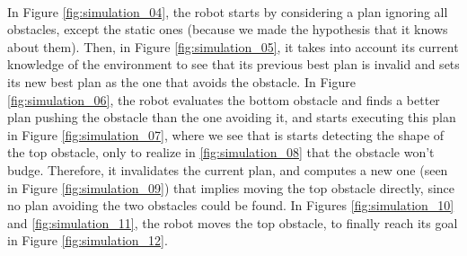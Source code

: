 \paragraph{} In Figure \ref{fig:simulation_04}, the robot starts by considering a plan ignoring all obstacles, except the static ones (because we made the hypothesis that it knows about them). Then, in Figure \ref{fig:simulation_05}, it takes into account its current knowledge of the environment to see that its previous best plan is invalid and sets its new best plan as the one that avoids the obstacle. In Figure \ref{fig:simulation_06}, the robot evaluates the bottom obstacle and finds a better plan pushing the obstacle than the one avoiding it, and starts executing this plan in Figure \ref{fig:simulation_07}, where we see that is starts detecting the shape of the top obstacle, only to realize in \ref{fig:simulation_08} that the obstacle won't budge. Therefore, it invalidates the current plan, and computes a new one (seen in Figure \ref{fig:simulation_09}) that implies moving the top obstacle directly, since no plan avoiding the two obstacles could be found. In Figures \ref{fig:simulation_10} and \ref{fig:simulation_11}, the robot moves the top obstacle, to finally reach its goal in Figure \ref{fig:simulation_12}.

